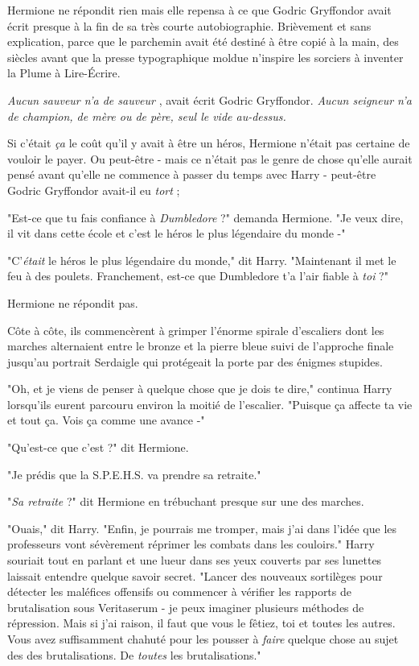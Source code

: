 Hermione ne répondit rien mais elle repensa à ce que Godric Gryffondor avait écrit presque à la fin de sa très courte autobiographie. Brièvement et sans explication, parce que le parchemin avait été destiné à être copié à la main, des siècles avant que la presse typographique moldue n'inspire les sorciers à inventer la Plume à Lire-Écrire.

\emph{Aucun sauveur n'a de sauveur} , avait écrit Godric Gryffondor. \emph{Aucun seigneur n'a de champion, de mère ou de père, seul le vide au-dessus.} 

Si c'était \emph{ça}  le coût qu'il y avait à être un héros, Hermione n'était pas certaine de vouloir le payer. Ou peut-être - mais ce n'était pas le genre de chose qu'elle aurait pensé avant qu'elle ne commence à passer du temps avec Harry - peut-être Godric Gryffondor avait-il eu \emph{tort} ;

"Est-ce que tu fais confiance à \emph{Dumbledore}  ?" demanda Hermione. "Je veux dire, il vit dans cette école et c'est le héros le plus légendaire du monde -"

"C'\emph{était}  le héros le plus légendaire du monde," dit Harry. "Maintenant il met le feu à des poulets. Franchement, est-ce que Dumbledore t'a l'air fiable à \emph{toi}  ?"

Hermione ne répondit pas.

Côte à côte, ils commencèrent à grimper l'énorme spirale d'escaliers dont les marches alternaient entre le bronze et la pierre bleue suivi de l'approche finale jusqu'au portrait Serdaigle qui protégeait la porte par des énigmes stupides.

"Oh, et je viens de penser à quelque chose que je dois te dire," continua Harry lorsqu'ils eurent parcouru environ la moitié de l'escalier. "Puisque ça affecte ta vie et tout ça. Vois ça comme une avance -"

"Qu'est-ce que c'est ?" dit Hermione.

"Je prédis que la S.P.E.H.S. va prendre sa retraite."

"\emph{Sa retraite}  ?" dit Hermione en trébuchant presque sur une des marches.

"Ouais," dit Harry. "Enfin, je pourrais me tromper, mais j'ai dans l'idée que les professeurs vont sévèrement réprimer les combats dans les couloirs." Harry souriait tout en parlant et une lueur dans ses yeux couverts par ses lunettes laissait entendre quelque savoir secret. "Lancer des nouveaux sortilèges pour détecter les maléfices offensifs ou commencer à vérifier les rapports de brutalisation sous Veritaserum - je peux imaginer plusieurs méthodes de répression. Mais si j'ai raison, il faut que vous le fêtiez, toi et toutes les autres. Vous avez suffisamment chahuté pour les pousser à \emph{faire}  quelque chose au sujet des des brutalisations. De \emph{toutes}  les brutalisations."

